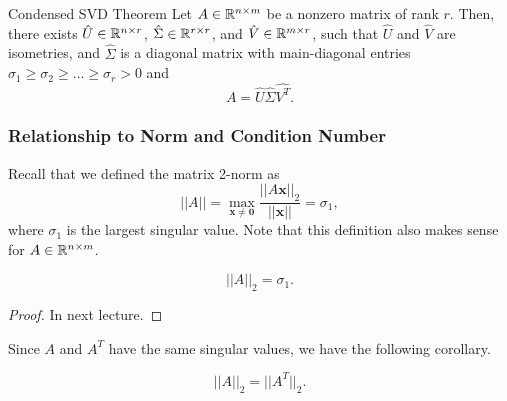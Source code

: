 \documentclass[letterpaper]{article}
\newcommand{\0}{\mathbf{0}}
\newcommand{\x}{\mathbf{x}}
\begin{document}
\begin{theorem}{Condensed SVD Theorem}{}
    Let $A \in \mathbb{R}^{n \times m}$ be a nonzero matrix of rank $r$. Then, there exists $\hat{U} \in \mathbb{R}^{n \times r}$, $\hat{\Sigma} \in \mathbb{R}^{r \times r}$, and $\hat{V} \in \mathbb{R}^{m \times r}$, such that $\hat{U}$ and $\hat{V}$ are isometries, and $\hat{\Sigma}$ is a diagonal matrix with main-diagonal entries $\sigma_1 \geq \sigma_2 \geq \hdots \geq \sigma_r > 0$ and \[A = \hat{U}\hat{\Sigma}\hat{V^T}.\]
\end{theorem}

\subsubsection{Relationship to Norm and Condition Number}
Recall that we defined the matrix 2-norm as  
\[||A|| = \max_{\x \neq \0} \frac{||A\x||_2}{||\x||} = \sigma_1,\] where $\sigma_1$ is the largest singular value. Note that this definition also makes sense for $A \in \mathbb{R}^{n \times m}$. 

\begin{theorem}{}{}
    \[||A||_2 = \sigma_1.\]
\end{theorem}
\begin{proof}
    In next lecture.
\end{proof}

Since $A$ and $A^T$ have the same singular values, we have the following corollary. 
\begin{corollary}{}{}
    \[||A||_2 = ||A^T||_2.\]
\end{corollary}
\end{document}
